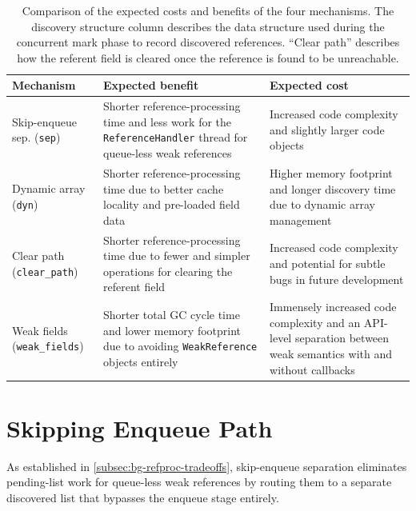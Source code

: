\begin{table}[t]
\centering
\caption[Cost and benefit comparison of the four mechanisms]{Comparison of the expected costs and benefits of the four mechanisms. The discovery structure column describes the data structure used during the concurrent mark phase to record discovered references. ``Clear path'' describes how the referent field is cleared once the reference is found to be unreachable.}
\label{tab:mechanism-cost-benefit}
\small
\begin{tabularx}{\textwidth}{@{}>{\hsize=1.0\hsize\raggedright\arraybackslash}X
                              >{\hsize=1.0\hsize\raggedright\arraybackslash}X
                              >{\hsize=1.0\hsize\raggedright\arraybackslash}X@{}}
\toprule
\textbf{Mechanism} & \textbf{Expected benefit} & \textbf{Expected cost} \\
\midrule
Skip-enqueue sep. (\texttt{sep})
  & Shorter reference-processing time and less work for the \texttt{ReferenceHandler} thread for queue-less weak references
  & Increased code complexity and slightly larger code objects\\
\addlinespace
Dynamic array (\texttt{dyn})
  & Shorter reference-processing time due to better cache locality and pre-loaded field data
  & Higher memory footprint and longer discovery time due to dynamic array management\\
\addlinespace
Clear path (\texttt{clear\_path})
  & Shorter reference-processing time due to fewer and simpler operations for clearing the referent field
  & Increased code complexity and potential for subtle bugs in future development\\
\addlinespace
Weak fields (\texttt{weak\_fields})
  & Shorter total \ac{GC} cycle time and lower memory footprint due to avoiding \texttt{WeakReference} objects entirely
  & Immensely increased code complexity and an API-level separation between weak semantics with and without callbacks\\
\bottomrule
\end{tabularx}
\normalsize
\end{table}

\section{Skipping Enqueue Path}
\label{sec:di-sep}
As established in \cref{subsec:bg-refproc-tradeoffs}, skip-enqueue separation eliminates pending-list work for queue-less weak references by routing them to a separate discovered list that bypasses the enqueue stage entirely.

